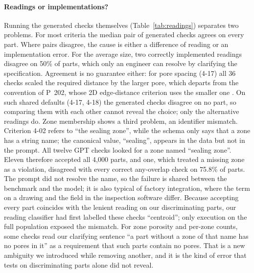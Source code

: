 \documentclass[letterpaper]{article} %
\begin{document}
\paragraph{Readings or implementations?} Running the generated checks themselves (Table~\ref{tab:readings}) separates two problems. For most criteria the median pair of generated checks agrees on every part. Where pairs disagree, the cause is either a difference of reading or an implementation error. For the average size, two correctly implemented readings disagree on 50\% of parts, which only an engineer can resolve by clarifying the specification. Agreement is no guarantee either: for pore spacing (4-17) all 36 checks scaled the required distance by the larger pore, which departs from the convention of P~202, whose 2D edge-distance criterion uses the smaller one \cite{bdg_p202}. On such shared defaults (4-17, 4-18) the generated checks disagree on no part, so comparing them with each other cannot reveal the choice; only the alternative readings do. Zone membership shows a third problem, an identifier mismatch. Criterion 4-02 refers to ``the sealing zone'', while the schema only says that a zone has a string name; the canonical value, ``sealing'', appears in the data but not in the prompt. All twelve GPT checks looked for a zone named ``sealing zone''. Eleven therefore accepted all 4{,}000 parts, and one, which treated a missing zone as a violation, disagreed with every correct any-overlap check on 75.8\% of parts. The prompt did not resolve the name, so the failure is shared between the benchmark and the model; it is also typical of factory integration, where the term on a drawing and the field in the inspection software differ. Because accepting every part coincides with the lenient reading on our discriminating parts, our reading classifier had first labelled these checks ``centroid''; only execution on the full population exposed the mismatch. For zone porosity and per-zone counts, some checks read our clarifying sentence ``a part without a zone of that name has no pores in it'' as a requirement that such parts contain no pores. That is a new ambiguity we introduced while removing another, and it is the kind of error that tests on discriminating parts alone did not reveal.
\end{document}
